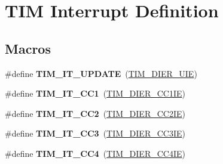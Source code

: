 \hypertarget{group___t_i_m___interrupt__definition}{}\section{T\+IM Interrupt Definition}
\label{group___t_i_m___interrupt__definition}
\subsection*{Macros}
\begin{DoxyCompactItemize}
\item 
\mbox{\label{group___t_i_m___interrupt__definition_ga6a48ecf88cae0402ff084202bfdd4f8e}} 
\#define {\bfseries T\+I\+M\+\_\+\+I\+T\+\_\+\+U\+P\+D\+A\+TE}~(\hyperlink{group___peripheral___registers___bits___definition_ga5c6d3e0495e6c06da4bdd0ad8995a32b}{T\+I\+M\+\_\+\+D\+I\+E\+R\+\_\+\+U\+IE})
\item 
\mbox{\label{group___t_i_m___interrupt__definition_ga02267a938ab4722c5013fffa447cf5a6}} 
\#define {\bfseries T\+I\+M\+\_\+\+I\+T\+\_\+\+C\+C1}~(\hyperlink{group___peripheral___registers___bits___definition_ga1ba7f7ca97eeaf6cc23cd6765c6bf678}{T\+I\+M\+\_\+\+D\+I\+E\+R\+\_\+\+C\+C1\+IE})
\item 
\mbox{\label{group___t_i_m___interrupt__definition_ga60f6b6c424b62ca58d3fafd8f5955e4f}} 
\#define {\bfseries T\+I\+M\+\_\+\+I\+T\+\_\+\+C\+C2}~(\hyperlink{group___peripheral___registers___bits___definition_ga757c59b690770adebf33e20d3d9dec15}{T\+I\+M\+\_\+\+D\+I\+E\+R\+\_\+\+C\+C2\+IE})
\item 
\mbox{\label{group___t_i_m___interrupt__definition_ga6aef020aebafd9e585283fbbaf8b841f}} 
\#define {\bfseries T\+I\+M\+\_\+\+I\+T\+\_\+\+C\+C3}~(\hyperlink{group___peripheral___registers___bits___definition_ga4edf003f04bcf250bddf5ed284201c2e}{T\+I\+M\+\_\+\+D\+I\+E\+R\+\_\+\+C\+C3\+IE})
\item 
\mbox{\label{group___t_i_m___interrupt__definition_ga1dce7f1bc32a258f2964cb7c05f413a6}} 
\#define {\bfseries T\+I\+M\+\_\+\+I\+T\+\_\+\+C\+C4}~(\hyperlink{group___peripheral___registers___bits___definition_ga6ad0f562a014572793b49fe87184338b}{T\+I\+M\+\_\+\+D\+I\+E\+R\+\_\+\+C\+C4\+IE})

\end{DoxyCompactItemize}
